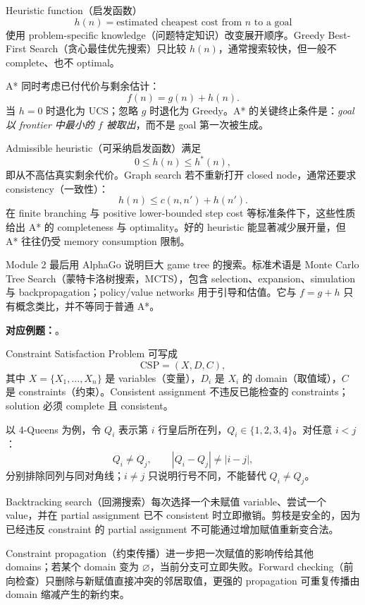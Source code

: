 
Heuristic function（启发函数）
\[
  h(n)=\text{estimated cheapest cost from }n\text{ to a goal}
\]
使用 problem-specific knowledge（问题特定知识）改变展开顺序。Greedy Best-First Search（贪心最佳优先搜索）只比较 $h(n)$，通常搜索较快，但一般不 complete、也不 optimal。

A* 同时考虑已付代价与剩余估计：
\[
  \boxed{f(n)=g(n)+h(n)}.
\]
当 $h=0$ 时退化为 UCS；忽略 $g$ 时退化为 Greedy。A* 的关键终止条件是：\emph{goal 以 frontier 中最小的 $f$ 被取出}，而不是 goal 第一次被生成。

Admissible heuristic（可采纳启发函数）满足
\[
  0\le h(n)\le h^*(n),
\]
即从不高估真实剩余代价。Graph search 若不重新打开 closed node，通常还要求 consistency（一致性）：
\[
  h(n)\le c(n,n')+h(n').
\]
在 finite branching 与 positive lower-bounded step cost 等标准条件下，这些性质给出 A* 的 completeness 与 optimality。好的 heuristic 能显著减少展开量，但 A* 往往仍受 memory consumption 限制。

Module 2 最后用 AlphaGo 说明巨大 game tree 的搜索。标准术语是 Monte Carlo Tree Search（蒙特卡洛树搜索，MCTS），包含 selection、expansion、simulation 与 backpropagation；policy/value networks 用于引导和估值。它与 $f=g+h$ 只有概念类比，并不等同于普通 A*。

\textbf{对应例题：}。


Constraint Satisfaction Problem 可写成
\[
  \boxed{\mathrm{CSP}=(X,D,C)},
\]
其中 $X=\{X_1,\ldots,X_n\}$ 是 variables（变量），$D_i$ 是 $X_i$ 的 domain（取值域），$C$ 是 constraints（约束）。Consistent assignment 不违反已能检查的 constraints；solution 必须 complete 且 consistent。

以 4-Queens 为例，令 $Q_i$ 表示第 $i$ 行皇后所在列，$Q_i\in\{1,2,3,4\}$。对任意 $i<j$：
\[
  \boxed{Q_i\ne Q_j},\qquad
  \boxed{|Q_i-Q_j|\ne |i-j|},
\]
分别排除同列与同对角线；$i\ne j$ 只说明行号不同，不能替代 $Q_i\ne Q_j$。

Backtracking search（回溯搜索）每次选择一个未赋值 variable、尝试一个 value，并在 partial assignment 已不 consistent 时立即撤销。剪枝是安全的，因为已经违反 constraint 的 partial assignment 不可能通过增加赋值重新变合法。

Constraint propagation（约束传播）进一步把一次赋值的影响传给其他 domains；若某个 domain 变为 $\varnothing$，当前分支可立即失败。Forward checking（前向检查）只删除与新赋值直接冲突的邻居取值，更强的 propagation 可重复传播由 domain 缩减产生的新约束。

